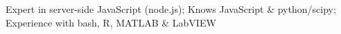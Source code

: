 \item Expert in server-side JavaScript (node.js); Knows JavaScript \& python/scipy; Experience with bash, R, MATLAB \& LabVIEW
